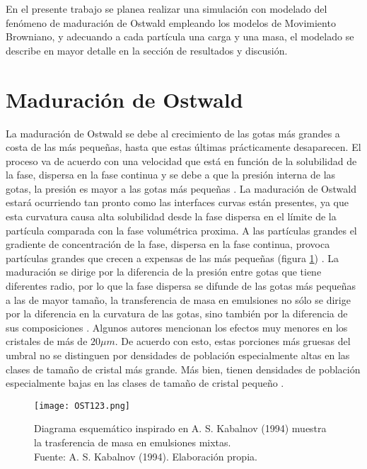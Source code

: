 \documentclass[3pt,twocolumn]{elsarticle}
\begin{document}
En el presente trabajo se planea realizar una simulación con modelado del fenómeno de maduración de Ostwald empleando los modelos de Movimiento Browniano, y adecuando a cada partícula una carga y una masa, el modelado se describe en mayor detalle en la sección de resultados y discusión.


\section{Maduraci\'on de Ostwald}
La maduración de Ostwald se debe al crecimiento de las gotas más grandes a costa de las más pequeñas, hasta que estas últimas prácticamente desaparecen. El proceso va de acuerdo con una velocidad que está en función de la solubilidad de la fase, dispersa en la fase continua y se debe a que la presión interna de las gotas, la presión es mayor a las gotas más pequeñas \cite{a15}. La maduración de Ostwald estará ocurriendo tan pronto como las interfaces curvas están presentes, ya que esta curvatura causa alta solubilidad desde la fase dispersa en el límite de la partícula comparada con la fase volumétrica proxima. A las partículas grandes el gradiente de concentración de la fase, dispersa en la fase continua, provoca partículas grandes que crecen a expensas de las más pequeñas (figura \ref{a14i}) \cite{a14}.
La maduración se dirige por la diferencia de la presión entre gotas que tiene diferentes radio, por lo que la fase dispersa se difunde de las gotas más pequeñas a las de mayor tamaño, la transferencia de masa en emulsiones no sólo se dirige por la diferencia en la curvatura de las gotas, sino también por la diferencia de sus composiciones \cite{a15}. Algunos autores mencionan los efectos muy menores en los cristales de más de $20 \mu m$. De acuerdo con esto, estas porciones más gruesas del umbral no se distinguen por densidades de población especialmente altas en las clases de tamaño de cristal más grande. Más bien, tienen densidades de población especialmente bajas en las clases de tamaño de cristal pequeño \cite{a7}.


	\begin{figure}[h!]
				\centering
				\texttt{[image: OST123.png]} 
				\caption{Diagrama esquemático inspirado en A. S. Kabalnov (1994) \cite{a14} muestra la trasferencia de masa en emulsiones mixtas.\\
				Fuente: A. S. Kabalnov (1994).
				Elaboración propia. 
				}
		\label{a14i}
\end{figure}
\end{document}
